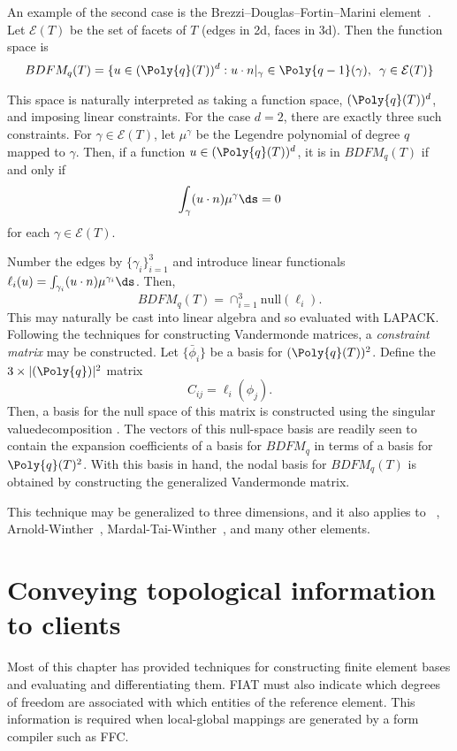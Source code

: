 An example of the second case is the Brezzi--Douglas--Fortin--Marini
element~\citep{BrezziFortin1991}.  Let \( \mathcal{E}(T) \) be the set of
facets of \( T \) (edges in 2d, faces in 3d). Then the function
space is
\[
BDFM_q(T) = \{ u \in (\Poly{q}(T))^d : u\cdot n|_{\gamma} \in
\Poly{q-1}(\gamma), \, \, \, \gamma \in \mathcal{E}(T) \}
\]

This space is naturally interpreted as taking a function space, \(
(\Poly{q}(T))^d \), and imposing linear constraints.  For the case \( d =
2 \), there are exactly three such constraints.  For \( \gamma \in
\mathcal{E}(T) \), let \( \mu^\gamma \) be the Legendre polynomial of
degree \( q \) mapped to \( \gamma \).  Then, if a function \( u \in
(\Poly{q}(T))^d \), it is in \( BDFM_q(T) \) if and only if\vspace*{4pt}
\[
\int_{\gamma} ( u \cdot n ) \mu^\gamma \ds = 0
\]
for each \( \gamma \in \mathcal{E}(T) \).

Number the edges by \( \{ \gamma_i \}_{i=1}^3 \) and introduce linear
functionals \( \ell_i(u) = \int_{\gamma_i} (u \cdot n) \mu^{\gamma_i}
\ds \).  Then,
\[
BDFM_q(T) = \cap_{i=1}^3 \mathrm{null}(\ell_i).
\]
This may naturally be cast into linear algebra and so evaluated with
LAPACK.  Following the techniques for constructing Vandermonde matrices,
a \emph{constraint matrix} may be constructed.  Let \( \{ \bar{\phi}_i \}
\) be a basis for \( (\Poly{q}(T))^2 \).  Define the \( 3 \times |(\Poly{q})|^2
\) matrix
\[
C_{ij} = \ell_i( \phi_j ).
\]
Then, a basis for the null space of this matrix is constructed using
the singular value\break decomposition \citep{GolubVan1996}.  The vectors of this
null-space basis are readily seen to contain the expansion coefficients
of a basis for \( BDFM_q \) in terms of a basis for \( \Poly{q}(T)^2 \).
With this basis in hand, the nodal basis for \( BDFM_q(T) \) is obtained
by constructing the generalized Vandermonde matrix.

This technique may be generalized to three dimensions,
and it also applies to \nedelec{}~\citep{Nedelec1980},
Arnold-Winther~\citep{ArnoldWinther2002},
Mardal-Tai-Winther~\citep{MardalTaiWinther2002}, and many other elements.

\vspace*{3pt}
\section{Conveying topological information to clients}

Most of this chapter has provided techniques for constructing finite
element bases and evaluating and differentiating them.  FIAT must also
indicate which degrees of freedom are associated with which entities of
the reference element.  This information is required when local-global
mappings are generated by a form compiler such as FFC.

